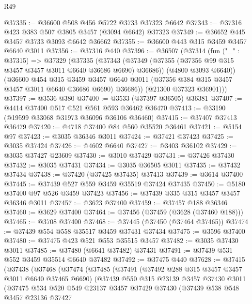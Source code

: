 \begin{lexlean}{R49}
\begin{coremodule}
@37335 := @36600 @508 @456 @5722 @3733 @37323 @6642
@37343 := @37316 @423 @383 @507 @3805 @3457 (@3094 @6642) @37323
@37349 := @36652 @445 @3457 @3733 @3093 @6642 @36662
@37355 := @36600 @443 @315 @3459 @3457 @6640 @3011
@37356 := @37316 @440
@37396 := @36507
    (@37314
      (fun ("_" : @37315) =>
      @37329
        (@37335
          (@37343
            (@37349 (@37355 (@37356 @99 @315 @3457 @3457 @3011 @6640 @36686 @6690) @36686))
            (@4800 @3093 @6640))
          (@36600
            @454
            @315
            @3459
            @3457
            @6640
            @3011
            (@37356 @384 @315 @3457 @3457 @3011 @6640 @36686 @6690)
            @36686))
        (@21300 @37323 @36901)))
@37397 := @3536 @380
@37400 := @3533 (@37397 @36505) @36381
@37407 := @4414 @37400 @517 @521 @561 @593 @36462 @36470
@37413 := @33190 (@19599 @33068 @31973 @36096 @36106 @36460)
@37415 := @37407 @37413 @36479
@37420 := @4718 @37400 @84 @560 @35520 @36461
@37421 := @5154 @97
@37423 := @3035 @36346 @3011
@37424 := @37421 @37423
@37425 := @3035 @37424
@37426 := @4602 @6640
@37427 := @3403 @36102
@37429 := @3035 @37427 @23609
@37430 := @3010 @37429
@37431 := @37426 @37430
@37432 := @3035 @37431
@37434 := @3035 @36505 @3011
@37435 := @37432 @37434
@37438 := @37420 (@37425 @37435) @37413
@37439 := @3614 @37400
@37445 := @37439 @527 @559 @3459 @35519 @37424 @37435
@37450 := @5180 @37400 @97 @526 @3459 @37423
@37456 := @37439 @335 @315 @3457 @3457 @36346 @3011
@37457 := @3623 @37400
@37459 := @37457 @188 @36346
@37460 := @3629 @37400
@37464 := @37456 (@37459 (@3628 (@37460 @188)))
@37465 := @3708 @37400
@37468 := @37445 (@37450 (@37464 @37465))
@37474 := @37439 @554 @558 @35517 @3459 @37431 @37434
@37475 := @3596 @37400
@37480 := @37475 @423 @521 @553 @35515 @3457
@37482 := @3035 @37430 @3011
@37485 := @37480 (@6641 @37482) @37431
@37491 := @37439 @531 @552 @3459 @35514 @6640 @37482
@37492 := @37475 @440
@37628 := @37415
    (@37438
      (@37468
        (@37474
          (@37485
            (@37491
              (@37492 @288 @315 @3457 @3457 @3011 @6640 @37465 @6690)
              (@37439
                @550
                @315
                @23139
                @3457
                @37430
                @3011
                (@37475
                  @534
                  @520
                  @549
                  @23137
                  @3457
                  @37429
                  @37430
                  (@37439
                    @538
                    @548
                    @3457
                    @23136
                    @37427

\end{coremodule}
\end{lexlean}
